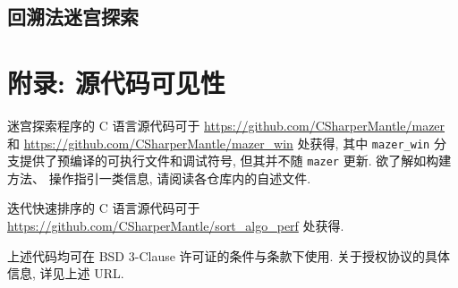 \documentclass[12pt]{article}
\begin{document}
\subsection{回溯法迷宫探索}



\section{附录: 源代码可见性}
\label{appendix_source_code}

迷宫探索程序的 C 语言源代码可于 \url{https://github.com/CSharperMantle/mazer} 和 \url{https://github.com/CSharperMantle/mazer_win} 处获得, 其中 \texttt{mazer\_win} 分支提供了预编译的可执行文件和调试符号, 但其并不随 \texttt{mazer} 更新. 欲了解如构建方法、 操作指引一类信息, 请阅读各仓库内的自述文件.

迭代快速排序的 C 语言源代码可于 \url{https://github.com/CSharperMantle/sort_algo_perf} 处获得.

上述代码均可在 BSD 3-Clause 许可证的条件与条款下使用. 关于授权协议的具体信息, 详见上述 URL.
\end{document}
